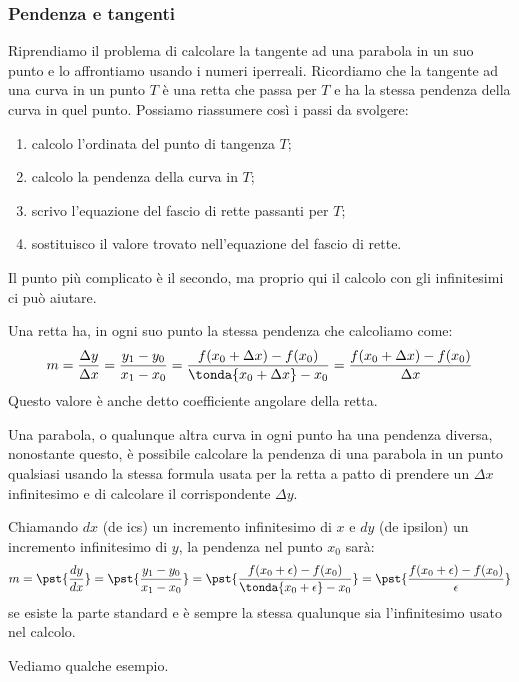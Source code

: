 \subsubsection{Pendenza e tangenti}
\label{subsubsec:insnum_tangenti_parabola}

Riprendiamo il problema di calcolare la tangente ad una parabola in un suo 
punto e lo affrontiamo usando i numeri iperreali. Ricordiamo che la 
tangente ad una curva in un punto \(T\) è una retta che passa per \(T\) e 
ha la stessa pendenza della curva in quel punto. 
Possiamo riassumere così i passi da svolgere:

\begin{enumerate}[noitemsep]
 \item calcolo l'ordinata del punto di tangenza \(T\);
 \item calcolo la pendenza della curva in  \(T\);
 \item scrivo l'equazione del fascio di rette passanti per \(T\);
 \item sostituisco il valore trovato nell'equazione del fascio di rette.
\end{enumerate}
Il punto più complicato è il secondo, ma proprio qui il calcolo con gli 
infinitesimi ci può aiutare. 

Una retta ha, in ogni suo punto la stessa pendenza che calcoliamo come:
\[m=\dfrac{\Delta y}{\Delta x}=\dfrac{y_1-y_0}{x_1-x_0}=
\dfrac{f(x_0+\Delta x)-f(x_0)}{\tonda{x_0+\Delta x}-x_0}=
\dfrac{f(x_0+\Delta x)-f(x_0)}{\Delta x}\]
Questo valore è anche detto coefficiente angolare della retta.

Una parabola, o qualunque altra curva in ogni punto ha una pendenza 
diversa, nonostante questo, è possibile calcolare la pendenza di una 
parabola in un punto qualsiasi usando la stessa formula usata per la retta 
a patto di prendere un \(\Delta x\) infinitesimo e di calcolare il 
corrispondente \(\Delta y\).

Chiamando \(d x\) (de ics) un incremento infinitesimo di \(x\) e 
\(d y\) (de ipsilon) un incremento infinitesimo di \(y\),
la pendenza nel punto \(x_0\) sarà:
\[m=\pst{\dfrac{d y}{d x}}=\pst{\dfrac{y_1-y_0}{x_1-x_0}}=
    \pst{\dfrac{f(x_0+\epsilon)-f(x_0)}{\tonda{x_0+\epsilon}-x_0}}=
    \pst{\dfrac{f(x_0+\epsilon)-f(x_0)}{\epsilon}}\]
se esiste la parte standard e è sempre la stessa qualunque sia 
l'infinitesimo usato nel calcolo.

Vediamo qualche esempio.


